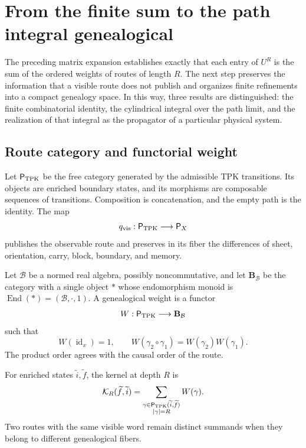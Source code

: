 \section{From the finite sum to the path integral genealogical}
\label{sec:integral-genealogica-caminos-rev2}

The preceding matrix expansion establishes exactly that each entry of
\(U^R\) is the sum of the ordered weights of routes of length \(R\).
The next step preserves the information that a visible route does not publish and
organizes finite refinements into a compact genealogy space. In
this way, three results are distinguished: the finite combinatorial identity, the
cylindrical integral over the path limit, and the realization of that
integral as the propagator of a particular physical system.

\subsection{Route category and functorial weight}

Let \(\mathsf P_{\rm TPK}\) be the free category generated by the admissible
TPK transitions. Its objects are enriched boundary states, and its
morphisms are composable sequences of transitions. Composition is
concatenation, and the empty path is the identity. The map
\[
 q_{\rm vis}:\mathsf P_{\rm TPK}\longrightarrow\mathsf P_X
\]
publishes the observable route and preserves in its fiber the differences of sheet,
orientation, carry, block, boundary, and memory.

\begin{definition}
\label{def:peso-genealogico-caminos-rev2}
Let \(\mathcal B\) be a normed real algebra, possibly noncommutative, and
let \(\mathbf B_{\mathcal B}\) be the category with a single object \(\ast\) whose
endomorphism monoid is
\(\operatorname{End}(\ast)=(\mathcal B,\cdot,1)\). A genealogical weight is a functor
\[
 W:\mathsf P_{\rm TPK}\longrightarrow\mathbf B_{\mathcal B}
\]
such that
\[
 W(\operatorname{id}_x)=1,
 \qquad
 W(\gamma_2\circ\gamma_1)=W(\gamma_2)W(\gamma_1).
\]
The product order agrees with the causal order of the route.
\end{definition}

For enriched states \(\widetilde i,\widetilde f\), the kernel at
depth \(R\) is
\begin{equation}
 \mathcal K_R(\widetilde f,\widetilde i)
 =\sum_{\substack{
   \gamma\in\mathsf P_{\rm TPK}(\widetilde i,\widetilde f)\\
   |\gamma|=R}}
 W(\gamma).
 \label{eq:kernel-genealogico-finito-rev2}
\end{equation}
Two routes with the same visible word remain distinct summands
when they belong to different genealogical fibers.

